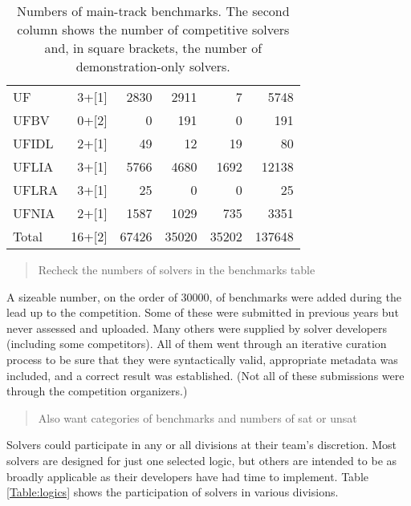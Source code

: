 \documentclass[twosize,11pt]{article}
\newcommand{\comment}[2]{\begin{quote}\sc #1\marginpar{\textcolor{red}{$\ast^{\mbox{#2}}$}}\end{quote}}
\newcommand{\davidc}[1]{\comment{#1}{DC}}
\begin{document}
\begin{table}
\begin{tabular}{|l|r|r|r|r|r|}
UF & 3+[1] & 2830 & 2911 & 7 & 5748 \\
UFBV & 0+[2] & 0 & 191 & 0 & 191 \\
UFIDL & 2+[1] & 49 & 12 & 19 & 80 \\
UFLIA & 3+[1] & 5766 & 4680 & 1692 & 12138 \\
UFLRA & 3+[1] & 25 & 0 & 0 & 25\\
UFNIA & 2+[1] & 1587 & 1029 & 735 & 3351 \\
\hline
Total & 16+[2] & 67426 & 35020 & 35202 & 137648 \\
\hline
\end{tabular}
\vspace{.2in}
\caption{Numbers of main-track benchmarks. The second column shows the number of competitive solvers and, in square brackets, the number of demonstration-only solvers.}
\label{Table:benchmarks}
\end{table}

\davidc{Recheck the numbers of solvers in the benchmarks table}

A sizeable number, on the order of 30000, of benchmarks were added during the lead up to the competition. Some of these were submitted in previous years but never assessed and uploaded. Many others were supplied by solver developers (including some competitors). All of them went through an iterative curation process to be sure that they were syntactically valid, appropriate metadata was included, and a correct result was established. (Not all of these submissions were through the competition organizers.)

\davidc{Also want categories of benchmarks and numbers of sat or unsat}



Solvers could participate in any or all divisions at their team's discretion. Most solvers are designed for just one selected logic, but others are intended to be as broadly applicable as their developers have had time to implement. Table \ref{Table:logics} shows the participation of solvers in various divisions.
\end{document}
